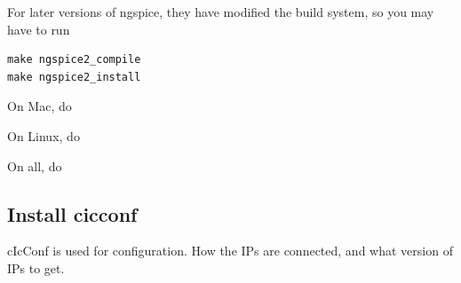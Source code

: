 For later versions of ngspice, they have modified the build system, so
you may have to run

\begin{verbatim}
make ngspice2_compile
make ngspice2_install
\end{verbatim}

On Mac, do

\begin{Shaded}
\begin{Highlighting}[]
\end{Highlighting}
\end{Shaded}

On Linux, do

\begin{Shaded}
\begin{Highlighting}[]
\end{Highlighting}
\end{Shaded}

On all, do

\begin{Shaded}
\begin{Highlighting}[]
 

 \DataTypeTok{\textbackslash{}}
\end{Highlighting}
\end{Shaded}

\subsection{Install cicconf}\label{install-cicconf}

cIcConf is used for configuration. How the IPs are connected, and what
version of IPs to get.

\begin{Shaded}
\begin{Highlighting}[]
 
\end{Highlighting}
\end{Shaded}

